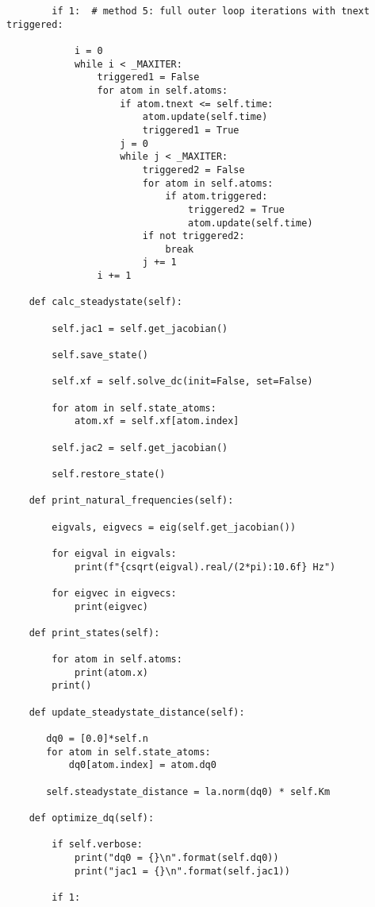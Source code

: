 \begin{lstlisting}
        if 1:  # method 5: full outer loop iterations with tnext triggered:

            i = 0
            while i < _MAXITER:
                triggered1 = False
                for atom in self.atoms:
                    if atom.tnext <= self.time:
                        atom.update(self.time)
                        triggered1 = True
                    j = 0
                    while j < _MAXITER:
                        triggered2 = False
                        for atom in self.atoms:
                            if atom.triggered:
                                triggered2 = True
                                atom.update(self.time)
                        if not triggered2:
                            break
                        j += 1
                i += 1

    def calc_steadystate(self):

        self.jac1 = self.get_jacobian()

        self.save_state()

        self.xf = self.solve_dc(init=False, set=False)

        for atom in self.state_atoms:
            atom.xf = self.xf[atom.index]

        self.jac2 = self.get_jacobian()

        self.restore_state()

    def print_natural_frequencies(self):

        eigvals, eigvecs = eig(self.get_jacobian())

        for eigval in eigvals:
            print(f"{csqrt(eigval).real/(2*pi):10.6f} Hz")

        for eigvec in eigvecs:
            print(eigvec)

    def print_states(self):

        for atom in self.atoms:
            print(atom.x)
        print()

    def update_steadystate_distance(self):

       dq0 = [0.0]*self.n
       for atom in self.state_atoms:
           dq0[atom.index] = atom.dq0

       self.steadystate_distance = la.norm(dq0) * self.Km

    def optimize_dq(self):

        if self.verbose:
            print("dq0 = {}\n".format(self.dq0))
            print("jac1 = {}\n".format(self.jac1))

        if 1:


\end{lstlisting}
